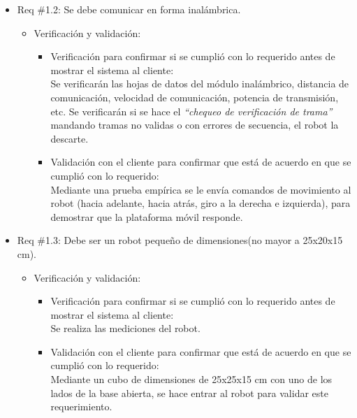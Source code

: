 \documentclass[11pt]{charter}
\begin{document}
\begin{itemize} 
\item Req \#1.2: Se debe comunicar en forma inalámbrica.
\begin{itemize} 
\item Verificación y validación:
	\begin{itemize}
	\item Verificación para confirmar si se cumplió con lo requerido 	antes de mostrar el sistema al cliente:\\
	Se verificarán las hojas de datos del módulo inalámbrico, 
	distancia de comunicación, velocidad de comunicación, potencia
	de transmisión, etc. Se verificarán si se hace el	
	\textit{``chequeo de verificación de trama''} mandando tramas no
	validas o con errores de secuencia, el robot la descarte.
	\item Validación con el cliente para confirmar que está de 				acuerdo en que se cumplió con lo requerido:\\
	Mediante una prueba empírica se le envía comandos de movimiento
	al robot (hacia adelante, hacia atrás, giro a la derecha e
	izquierda), para demostrar que la plataforma móvil responde.
\end{itemize}
	
	\end{itemize}
\end{itemize}

\begin{itemize} 
\item Req \#1.3: Debe ser un robot pequeño de dimensiones(no mayor a 25x20x15 cm).
\begin{itemize} 
\item Verificación y validación:
	\begin{itemize}
	\item Verificación para confirmar si se cumplió con lo requerido 	antes de mostrar el sistema al cliente:\\
	Se realiza las mediciones del robot.  
	\item Validación con el cliente para confirmar que está de 				acuerdo en que se cumplió con lo requerido:\\
	Mediante un cubo de dimensiones de 25x25x15 cm con uno de los
	lados de la base abierta, se hace entrar al robot para validar
	este requerimiento.  
	\end{itemize}
\end{itemize}
\end{itemize}
\end{document}
